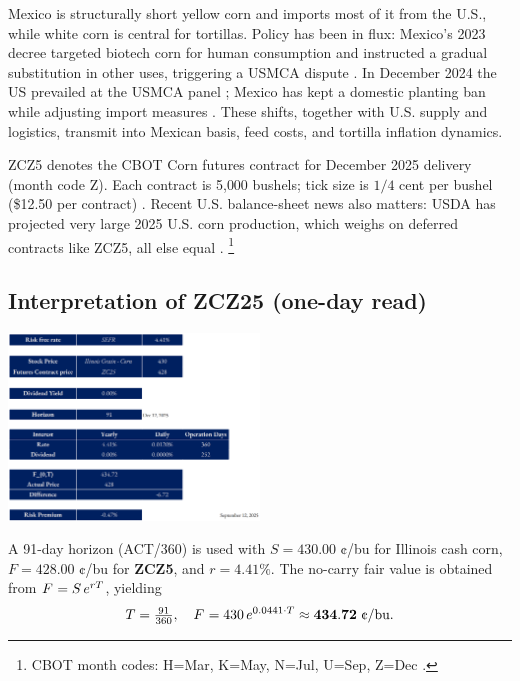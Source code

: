 \documentclass[11pt,a4paper]{article} %
\begin{document}
Mexico is structurally short yellow corn and imports most of it from the U.S., while white corn is central for tortillas. Policy has been in flux: Mexico's 2023 decree targeted biotech corn for human consumption and instructed a gradual substitution in other uses, triggering a USMCA dispute \citep{fas_mexico_decree_2023,ustr_usmca_biotech_2023}. In December 2024 the US prevailed at the USMCA panel \citep{ustr_usmca_biotech_win_2024}; Mexico has kept a domestic planting ban while adjusting import measures \citep{reuters_mexico_gm_ban_2025,fas_mexico_grain_annual_2025}. These shifts, together with U.S. supply and logistics, transmit into Mexican basis, feed costs, and tortilla inflation dynamics.

ZCZ5 denotes the CBOT Corn futures contract for December 2025 delivery (month code Z). Each contract is 5{,}000 bushels; tick size is $1/4$ cent per bushel (\$12.50 per contract) \citep{barchart_zc_specs}.
Recent U.S. balance-sheet news also matters: USDA has projected very large 2025 U.S. corn production, which weighs on deferred contracts like ZCZ5, all else equal \citep{reuters_record_crop_2025}.
\footnote{CBOT month codes: H=Mar, K=May, N=Jul, U=Sep, Z=Dec \citep{barchart_zc_specs}.}

\subsection{Interpretation of \texorpdfstring{ZCZ25}{ZCZ25} (one-day read)}

\begin{center}
\includegraphics[width=0.5\textwidth]{figures/corn2.png}
\end{center}

A 91-day horizon (ACT/360) is used with $S=430.00$ ¢/bu for Illinois cash corn, $F=428.00$ ¢/bu for \textbf{ZCZ5}, and $r=4.41\%$. The no-carry fair value is obtained from $F^{\*}=S\,e^{rT}$, yielding
\[
T=\tfrac{91}{360},\quad F^{\*}=430\,e^{0.0441\cdot T}\approx \mathbf{434.72}\ \text{¢/bu}.
\]
\end{document}
